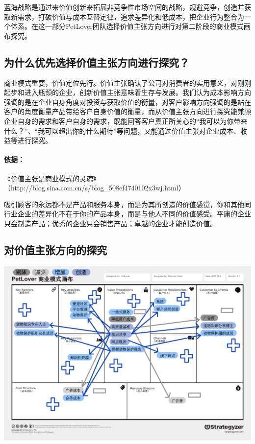 \documentclass[a4paper]{ctexart}
\begin{document}
蓝海战略是通过来价值创新来拓展非竞争性市场空间的战略，规避竞争，创造并获取新需求，打破价值与成本互替定律，追求差异化和低成本，把企业行为整合为一个体系。在这一部分PetLover团队选择价值主张方向进行对第二阶段的商业模式画布探究。

\subsection{为什么优先选择价值主张方向进行探究？}

商业模式重要，价值定位先行。价值主张确认了公司对消费者的实用意义，对刚刚起步和进入瓶颈的企业，创新价值主张意味着生存与发展。我们认为成本影响方向强调的是在企业自身角度对投资与获取价值的衡量，对客户影响方向强调的是站在客户的角度衡量产品带给客户自身价值的衡量，而从价值主张方向进行探究能兼顾企业自身的需求和客户自身的需求，既能回答客户真正所关心的“我可以为你带来什么？”、“我可以超出你的什么期待”等问题，又能通过价值主张对企业成本、收益等进行探究。

\paragraph{依据：}《价值主张是商业模式的灵魂》（http://blog.sina.com.cn/s/blog\_508ef4740102x3wj.html）

吸引顾客的永远都不是产品和服务本身，而是为其所创造的价值感觉，你和其他同行业企业的差异化不在于你的产品本身，而是与他人不同的价值感受。平庸的企业只会制造产品；优秀的企业只会销售产品；卓越的企业才能创造价值。

\subsection{对价值主张方向的探究}
\begin{center}
  \includegraphics[scale=0.75]{价值主张.pdf}
\end{center}
\end{document}
